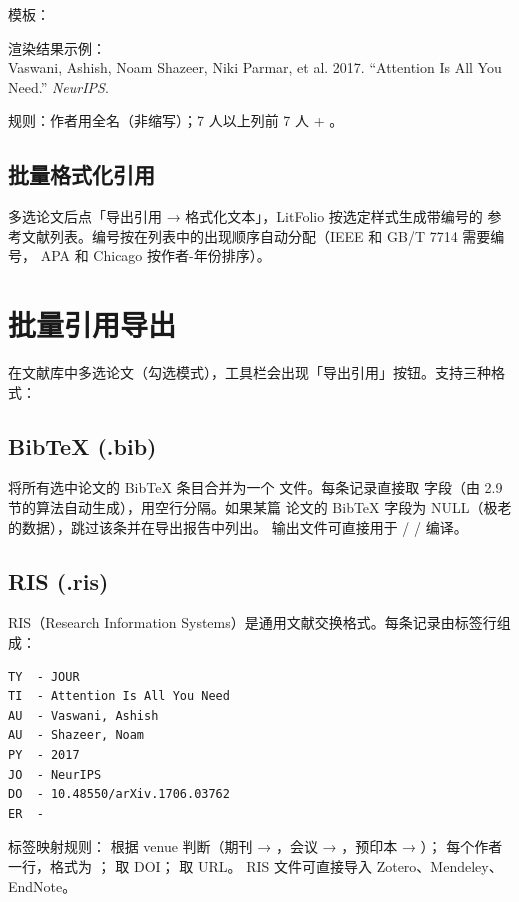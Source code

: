 模板：

渲染结果示例：\\
Vaswani, Ashish, Noam Shazeer, Niki Parmar, et al. 2017.
``Attention Is All You Need.'' \textit{NeurIPS}.

规则：作者用全名（非缩写）；7 人以上列前 7 人 + 。

\subsection{批量格式化引用}

多选论文后点「导出引用 → 格式化文本」，LitFolio 按选定样式生成带编号的
参考文献列表。编号按在列表中的出现顺序自动分配（IEEE 和 GB/T 7714 需要编号，
APA 和 Chicago 按作者-年份排序）。

\section{批量引用导出}

在文献库中多选论文（勾选模式），工具栏会出现「导出引用」按钮。支持三种格式：

\subsection{BibTeX (.bib)}

将所有选中论文的 BibTeX 条目合并为一个  文件。每条记录直接取
 字段（由 2.9 节的算法自动生成），用空行分隔。如果某篇
论文的 BibTeX 字段为 NULL（极老的数据），跳过该条并在导出报告中列出。
输出文件可直接用于  /  /  编译。

\subsection{RIS (.ris)}

RIS（Research Information Systems）是通用文献交换格式。每条记录由标签行组成：

\begin{verbatim}
TY  - JOUR
TI  - Attention Is All You Need
AU  - Vaswani, Ashish
AU  - Shazeer, Noam
PY  - 2017
JO  - NeurIPS
DO  - 10.48550/arXiv.1706.03762
ER  -
\end{verbatim}

标签映射规则： 根据 venue 判断（期刊 → ，会议 →
，预印本 → ）； 每个作者一行，格式为
； 取 DOI； 取 URL。
RIS 文件可直接导入 Zotero、Mendeley、EndNote。

